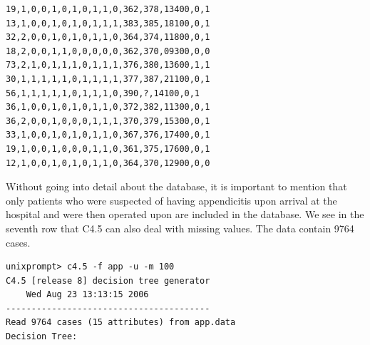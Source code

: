 \documentclass[10pt]{book}
\begin{document}
\begin{verbatim}
19,1,0,0,1,0,1,0,1,1,0,362,378,13400,0,1
13,1,0,0,1,0,1,0,1,1,1,383,385,18100,0,1
32,2,0,0,1,0,1,0,1,1,0,364,374,11800,0,1
18,2,0,0,1,1,0,0,0,0,0,362,370,09300,0,0
73,2,1,0,1,1,1,0,1,1,1,376,380,13600,1,1
30,1,1,1,1,1,0,1,1,1,1,377,387,21100,0,1
56,1,1,1,1,1,0,1,1,1,0,390,?,14100,0,1
36,1,0,0,1,0,1,0,1,1,0,372,382,11300,0,1
36,2,0,0,1,0,0,0,1,1,1,370,379,15300,0,1
33,1,0,0,1,0,1,0,1,1,0,367,376,17400,0,1
19,1,0,0,1,0,0,0,1,1,0,361,375,17600,0,1
12,1,0,0,1,0,1,0,1,1,0,364,370,12900,0,0
\end{verbatim}

Without going into detail about the database, it is important to mention that only patients who were suspected of having appendicitis upon arrival at the hospital and were then operated upon are included in the database. We see in the seventh row that C4.5 can also deal with missing values. The data contain 9764 cases.

\begin{verbatim}
unixprompt> c4.5 -f app -u -m 100
C4.5 [release 8] decision tree generator
    Wed Aug 23 13:13:15 2006
----------------------------------------
Read 9764 cases (15 attributes) from app.data
Decision Tree:
\end{verbatim}
\end{document}
